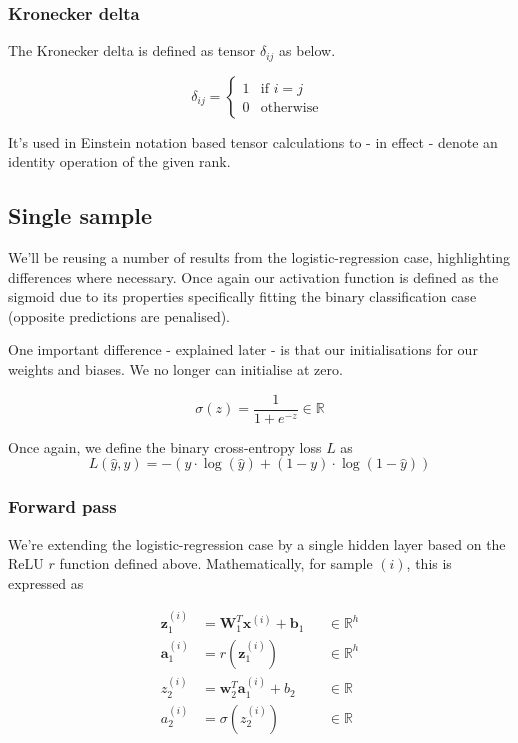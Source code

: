 \documentclass[varwidth,border=2cm]{standalone}
\begin{document}
\subsubsection{Kronecker delta}
The Kronecker delta is defined as tensor $\delta_{ij}$ as below.

\begin{equation}
\delta_{ij} =
\begin{cases}
1 & \text{if } i = j \\
0 & \text{otherwise }
\end{cases}
\label{kronecker_delta}
\end{equation}

It's used in Einstein notation based tensor calculations to - in effect - denote an identity operation of the given rank.

\subsection{Single sample}

We'll be reusing a number of results from the logistic-regression case, highlighting differences where necessary. Once again our activation function is defined as the sigmoid due to its properties specifically fitting the binary classification case (opposite predictions are penalised).

One important difference - explained later - is that our initialisations for our weights and biases. We no longer can initialise at zero.

\begin{equation}
\sigma(z) = \frac{1}{1 + e^{-z}} \in \mathbb{R} \nonumber
\end{equation}

Once again, we define the binary cross-entropy loss $L$ as
\begin{equation}
L(\hat y, y) = -\left(y \cdot \log(\hat y) + (1-y) \cdot \log(1-\hat y)\right) \nonumber
\end{equation}

\subsubsection{Forward pass}

We're extending the logistic-regression case by a single hidden layer based on the ReLU $r$ function defined above. Mathematically, for sample $(i)$, this is expressed as

\begin{align}
\label{forward_pass}
\bm z_1 ^{(i)} &= \bm W_1 ^T \bm x ^{(i)} + \bm b_1 && \in \mathbb{R}^h \\
\bm a_1 ^{(i)} &= r(\bm z_1 ^{(i)}) && \in \mathbb{R}^h \nonumber \\
z_2 ^{(i)} &= \bm w_2 ^T \bm a_1 ^{(i)} + b_2 && \in \mathbb{R} \nonumber \\
a_2 ^{(i)} &= \sigma(z_2 ^{(i)}) && \in \mathbb{R} \nonumber
\end{align}
\end{document}
